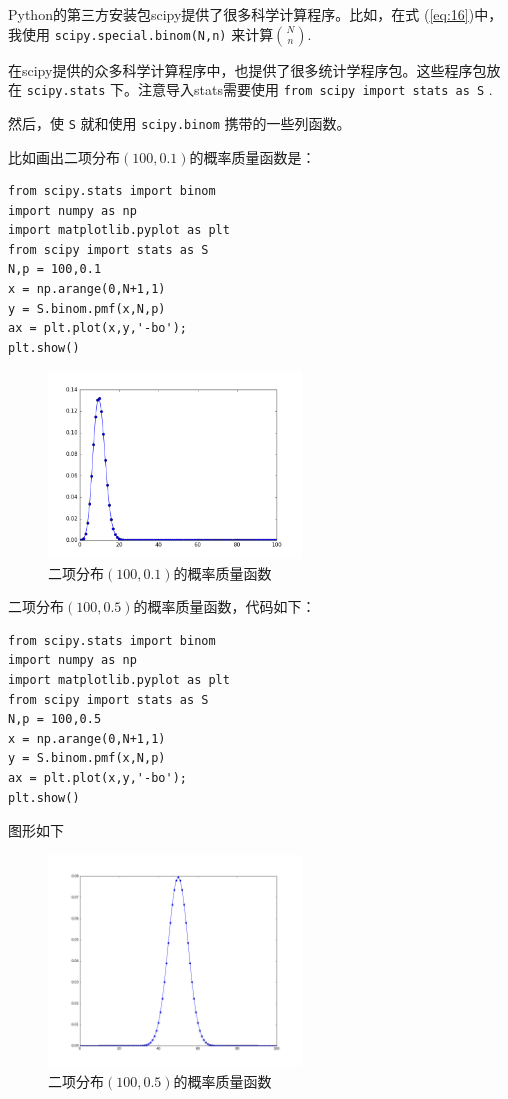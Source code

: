 \documentclass[10pt,a4paper,UTF8]{article}
\begin{document}
Python的第三方安装包scipy提供了很多科学计算程序。比如，在式 (\ref{eq:16})中，我使用 \texttt{scipy.special.binom(N,n)} 来计算\(\binom{N}{n}\).

在scipy提供的众多科学计算程序中，也提供了很多统计学程序包。这些程序包放在 \texttt{scipy.stats} 下。注意导入stats需要使用 \texttt{from scipy import stats as S} .

然后，使 \texttt{S} 就和使用 \texttt{scipy.binom} 携带的一些列函数。

比如画出二项分布\((100,0.1)\)的概率质量函数是：
\lstset{language=Python,label= ,caption= ,captionpos=b,firstnumber=1,numbers=left}
\begin{lstlisting}
from scipy.stats import binom
import numpy as np
import matplotlib.pyplot as plt
from scipy import stats as S
N,p = 100,0.1
x = np.arange(0,N+1,1)
y = S.binom.pmf(x,N,p)
ax = plt.plot(x,y,'-bo');
plt.show()
\end{lstlisting}

\begin{figure}[htbp]
\centering
\includegraphics[width=0.6\textwidth]{../../img/math_probability/20170701binaryn100p0dot1.png}
\caption{\label{fig:orgfc1faea}
二项分布\((100,0.1)\)的概率质量函数}
\end{figure}

二项分布\((100,0.5)\)的概率质量函数，代码如下：
\lstset{language=Python,label= ,caption= ,captionpos=b,firstnumber=1,numbers=left}
\begin{lstlisting}
from scipy.stats import binom
import numpy as np
import matplotlib.pyplot as plt
from scipy import stats as S
N,p = 100,0.5
x = np.arange(0,N+1,1)
y = S.binom.pmf(x,N,p)
ax = plt.plot(x,y,'-bo');
plt.show()
\end{lstlisting}
图形如下
\begin{figure}[htbp]
\centering
\includegraphics[width=0.6\textwidth]{../../img/math_probability/20170701binaryn100p0dot5.png}
\caption{\label{fig:org86630bf}
二项分布\((100,0.5)\)的概率质量函数}
\end{figure}
\end{document}
